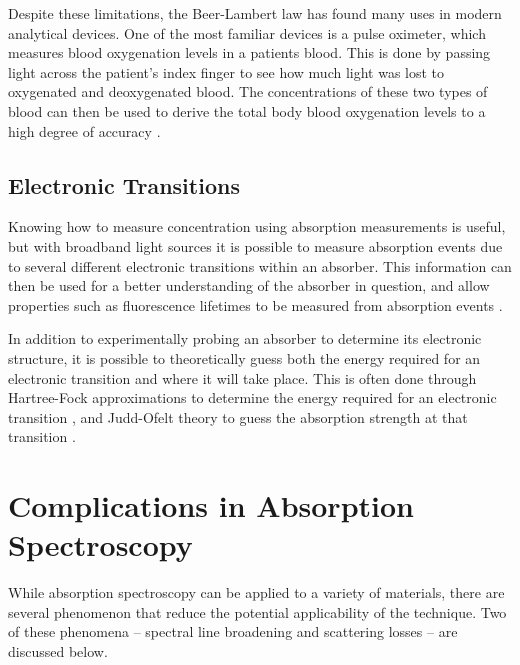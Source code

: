 
Despite these limitations, the Beer-Lambert law has found many uses in modern
analytical devices. One of the most familiar devices is a pulse oximeter, which
measures blood oxygenation levels in a patients blood. This is done by passing
light across the patient's index finger to see how much light was lost to
oxygenated and deoxygenated blood. The concentrations of these two types of
blood can then be used to derive the total body blood oxygenation levels to a
high degree of accuracy \cite{Wukitsch:1987tb}.



\subsection{Electronic Transitions}\label{subsec:elec_trans}


Knowing how to measure concentration using absorption measurements is useful,
but with broadband light sources it is possible to measure absorption events
due to several different electronic transitions within an absorber. This
information can then be used for a better understanding of the absorber in
question, and allow properties such as fluorescence lifetimes to be measured
from absorption events \cite{Werts:2002fs}.

In addition to experimentally probing an absorber to determine its electronic
structure, it is possible to theoretically guess both the energy required for
an electronic transition and where it will take place. This is often done
through Hartree-Fock approximations to determine the energy required for an
electronic transition \cite{Szabo:1996tu}, and Judd-Ofelt theory to guess the
absorption strength at that transition \cite{Judd:1962uq}.



\section{Complications in Absorption Spectroscopy}\label{sec:comp_abs}

While absorption spectroscopy can be applied to a variety of materials, there
are several phenomenon that reduce the potential applicability of the
technique. Two of these phenomena -- spectral line broadening and scattering
losses -- are discussed below.



